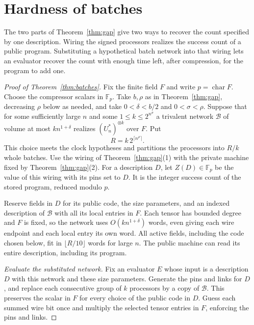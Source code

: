 \section{Hardness of batches}\label{sec:batches}

The two parts of Theorem~\ref{thm:gap} give two ways to recover the
count specified by one description. Wiring the signed processors realizes the
success count of a public program. Substituting a hypothetical batch
network into that wiring lets an evaluator recover the count with
enough time left, after compression, for the program to add one.

\begin{proof}[Proof of Theorem~\ref{thm:batches}]
Fix the finite field $F$ and write $p=\operatorname{char}F$.
Choose the compressor scalars in $\mathbb F_p$. Take $b,\rho$ as in
Theorem~\ref{thm:gap}, decreasing $\rho$ below as needed, and take
$0<\delta<b/2$ and $0<\sigma<\rho$. Suppose that for some sufficiently
large $n$ and some $1\le k\le 2^{n^\sigma}$ a trivalent network
$\mathcal B$ of volume at most $kn^{1+\delta}$ realizes
$(U_n^*)^{\otimes k}$ over $F$. Put
\[
                    R=k\,2^{\lceil n^\rho\rceil}.
\]
This choice meets the clock hypotheses and partitions the processors
into $R/k$ whole batches. Use the wiring of Theorem~\ref{thm:gap}(1)
with the private machine fixed by Theorem~\ref{thm:gap}(2).
For a description $D$, let $Z(D)\in\mathbb F_p$ be the value of this
wiring with its pins set to $D$. It is the integer success count of the
stored program, reduced modulo $p$.

Reserve fields in $D$ for its public code, the size parameters, and
an indexed description of $\mathcal B$ with all its local entries in
$F$. Each tensor has bounded degree and $F$ is fixed, so the network
uses $O(kn^{1+\delta})$ words, even giving each wire endpoint and each
local entry its own word. All active fields, including the code chosen
below, fit in $\lfloor R/10\rfloor$ words for large $n$. The public
machine can read its entire description, including its program.

\smallskip
\noindent\emph{Evaluate the substituted network.}
Fix an evaluator $E$ whose input is a description $D$ with this network
and these size parameters. Generate the pins and links for $D$, and
replace each consecutive group of $k$ processors by a copy of
$\mathcal B$. This preserves the scalar in $F$ for every choice of the
public code in $D$. Guess each summed wire bit once and multiply the
selected tensor entries in $F$, enforcing the pins and links.


\end{proof}
